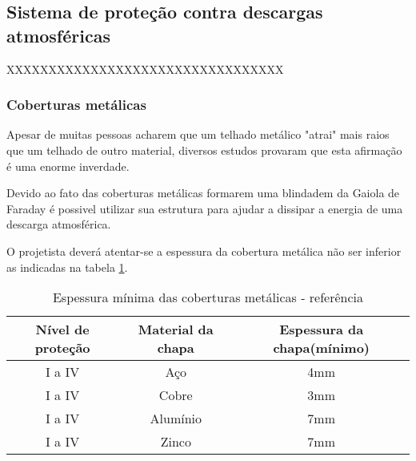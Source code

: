 \subsection{Sistema de proteção contra descargas atmosféricas} \label{subsection: spda}

XXXXXXXXXXXXXXXXXXXXXXXXXXXXXXXXX

\subsubsection{Coberturas metálicas}

Apesar de muitas pessoas acharem que um telhado metálico "atrai" mais raios que um telhado de outro material, diversos estudos provaram que esta afirmação é uma enorme inverdade.

Devido ao fato das coberturas metálicas formarem uma blindadem da Gaiola de Faraday é possivel utilizar sua estrutura para ajudar a dissipar a energia de uma descarga atmosférica.

O projetista deverá atentar-se a espessura da cobertura metálica não ser inferior as indicadas na tabela \ref{table: espessura chapa}.

\begin{table}[ht]
	\centering
	\caption{Espessura mínima das coberturas metálicas - referência \cite{2015aterramento}}
	\begin{tabular}[t]{ccc}
		\toprule
		\color{Tue-red}\textbf{Nível de proteção}&\color{Tue-red}\textbf{Material da chapa}&\color{Tue-red}\textbf{Espessura da chapa(mínimo)}\\
		\midrule
		I a IV&Aço&4mm\\
		I a IV&Cobre&3mm\\
		I a IV&Alumínio&7mm\\
		I a IV&Zinco&7mm\\
		\bottomrule
	\end{tabular}
	\label{table: espessura chapa}
\end{table}


%

%

%
\newpage
